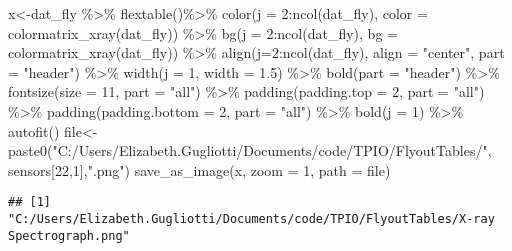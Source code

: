 \documentclass[
]{article}
\newenvironment{Shaded}{\begin{snugshade}}{\end{snugshade}}
\newcommand{\AttributeTok}[1]{\textcolor[rgb]{0.77,0.63,0.00}{#1}}
\newcommand{\DecValTok}[1]{\textcolor[rgb]{0.00,0.00,0.81}{#1}}
\newcommand{\FloatTok}[1]{\textcolor[rgb]{0.00,0.00,0.81}{#1}}
\newcommand{\FunctionTok}[1]{\textcolor[rgb]{0.00,0.00,0.00}{#1}}
\newcommand{\NormalTok}[1]{#1}
\newcommand{\OtherTok}[1]{\textcolor[rgb]{0.56,0.35,0.01}{#1}}
\newcommand{\SpecialCharTok}[1]{\textcolor[rgb]{0.00,0.00,0.00}{#1}}
\newcommand{\StringTok}[1]{\textcolor[rgb]{0.31,0.60,0.02}{#1}}
\begin{document}
\begin{Shaded}
\begin{Highlighting}[]
\NormalTok{x}\OtherTok{\textless{}{-}}\NormalTok{dat\_fly }\SpecialCharTok{\%\textgreater{}\%}
    \FunctionTok{flextable}\NormalTok{()}\SpecialCharTok{\%\textgreater{}\%}
    \FunctionTok{color}\NormalTok{(}\AttributeTok{j =} \DecValTok{2}\SpecialCharTok{:}\FunctionTok{ncol}\NormalTok{(dat\_fly), }\AttributeTok{color =} \FunctionTok{colormatrix\_xray}\NormalTok{(dat\_fly)) }\SpecialCharTok{\%\textgreater{}\%}
    \FunctionTok{bg}\NormalTok{(}\AttributeTok{j =} \DecValTok{2}\SpecialCharTok{:}\FunctionTok{ncol}\NormalTok{(dat\_fly), }\AttributeTok{bg =} \FunctionTok{colormatrix\_xray}\NormalTok{(dat\_fly)) }\SpecialCharTok{\%\textgreater{}\%}
    \FunctionTok{align}\NormalTok{(}\AttributeTok{j=}\DecValTok{2}\SpecialCharTok{:}\FunctionTok{ncol}\NormalTok{(dat\_fly), }\AttributeTok{align =} \StringTok{"center"}\NormalTok{, }\AttributeTok{part =} \StringTok{"header"}\NormalTok{) }\SpecialCharTok{\%\textgreater{}\%}
    \FunctionTok{width}\NormalTok{(}\AttributeTok{j =} \DecValTok{1}\NormalTok{, }\AttributeTok{width =} \FloatTok{1.5}\NormalTok{) }\SpecialCharTok{\%\textgreater{}\%}
    \FunctionTok{bold}\NormalTok{(}\AttributeTok{part =} \StringTok{"header"}\NormalTok{) }\SpecialCharTok{\%\textgreater{}\%}
    \FunctionTok{fontsize}\NormalTok{(}\AttributeTok{size =} \DecValTok{11}\NormalTok{, }\AttributeTok{part =} \StringTok{"all"}\NormalTok{) }\SpecialCharTok{\%\textgreater{}\%}
    \FunctionTok{padding}\NormalTok{(}\AttributeTok{padding.top =} \DecValTok{2}\NormalTok{, }\AttributeTok{part =} \StringTok{"all"}\NormalTok{) }\SpecialCharTok{\%\textgreater{}\%}
    \FunctionTok{padding}\NormalTok{(}\AttributeTok{padding.bottom =} \DecValTok{2}\NormalTok{, }\AttributeTok{part =} \StringTok{"all"}\NormalTok{) }\SpecialCharTok{\%\textgreater{}\%}
    \FunctionTok{bold}\NormalTok{(}\AttributeTok{j =} \DecValTok{1}\NormalTok{) }\SpecialCharTok{\%\textgreater{}\%} \FunctionTok{autofit}\NormalTok{()}
\NormalTok{file}\OtherTok{\textless{}{-}}\FunctionTok{paste0}\NormalTok{(}\StringTok{"C:/Users/Elizabeth.Gugliotti/Documents/code/TPIO/FlyoutTables/"}\NormalTok{, sensors[}\DecValTok{22}\NormalTok{,}\DecValTok{1}\NormalTok{],}\StringTok{".png"}\NormalTok{)}
\FunctionTok{save\_as\_image}\NormalTok{(x, }\AttributeTok{zoom =} \DecValTok{1}\NormalTok{, }\AttributeTok{path =}\NormalTok{ file)}
\end{Highlighting}
\end{Shaded}

\begin{verbatim}
## [1] "C:/Users/Elizabeth.Gugliotti/Documents/code/TPIO/FlyoutTables/X-ray Spectrograph.png"
\end{verbatim}
\end{document}

